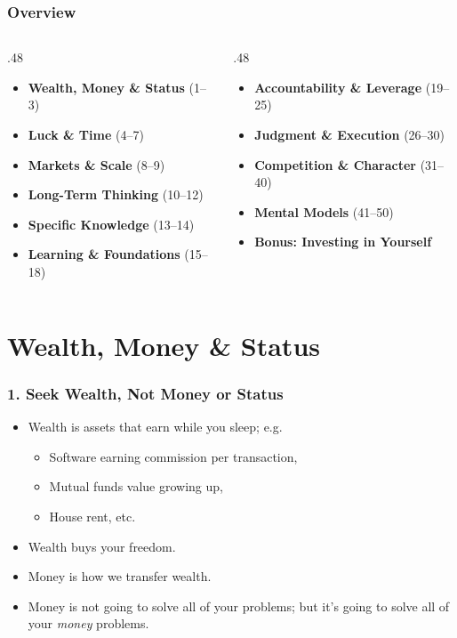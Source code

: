 \begin{frame}[fragile]
\frametitle{Overview}
\begin{columns}[T]
\begin{column}{.48\linewidth}
\begin{itemize}
  \item \textbf{Wealth, Money \& Status} (1--3)
  \item \textbf{Luck \& Time} (4--7)
  \item \textbf{Markets \& Scale} (8--9)
  \item \textbf{Long-Term Thinking} (10--12)
  \item \textbf{Specific Knowledge} (13--14)
  \item \textbf{Learning \& Foundations} (15--18)
\end{itemize}
\end{column}
\begin{column}{.48\linewidth}
\begin{itemize}
  \item \textbf{Accountability \& Leverage} (19--25)
  \item \textbf{Judgment \& Execution} (26--30)
  \item \textbf{Competition \& Character} (31--40)
  \item \textbf{Mental Models} (41--50)
  \item \textbf{Bonus: Investing in Yourself}
\end{itemize}
\end{column}
\end{columns}
\end{frame}

\section{Wealth, Money \& Status}

\begin{frame}[fragile]
\frametitle{1. Seek Wealth, Not Money or Status}
\begin{itemize}
\item Wealth is assets that earn while you sleep; e.g.
\begin{itemize}
\item Software earning commission per transaction, 
\item Mutual funds value growing up, 
\item House rent, etc.
\end{itemize}
\item Wealth buys your freedom.
\item Money is how we transfer wealth.
\item Money is not going to solve all of your problems; but it's going to solve all of your {\it money} problems.
\end{itemize}
\end{frame}


